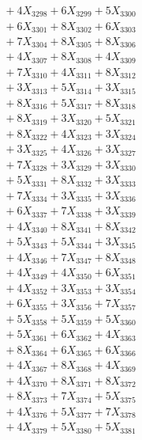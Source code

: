 \documentclass[a4paper,10pt]{article}
\begin{document}
{\begin{align}
&\;  + 4 X_{3298} + 6 X_{3299} + 5 X_{3300} \\[0.3ex]
&\;  + 6 X_{3301} + 8 X_{3302} + 6 X_{3303} \\[0.3ex]
&\;  + 7 X_{3304} + 8 X_{3305} + 8 X_{3306} \\[0.3ex]
&\;  + 4 X_{3307} + 8 X_{3308} + 4 X_{3309} \\[0.5ex]\allowbreak
&\;  + 7 X_{3310} + 4 X_{3311} + 8 X_{3312} \\[0.3ex]
&\;  + 3 X_{3313} + 5 X_{3314} + 3 X_{3315} \\[0.3ex]
&\;  + 8 X_{3316} + 5 X_{3317} + 8 X_{3318} \\[0.3ex]
&\;  + 8 X_{3319} + 3 X_{3320} + 5 X_{3321} \\[0.3ex]
&\;  + 8 X_{3322} + 4 X_{3323} + 3 X_{3324} \\[0.3ex]
&\;  + 3 X_{3325} + 4 X_{3326} + 3 X_{3327} \\[0.3ex]
&\;  + 7 X_{3328} + 3 X_{3329} + 3 X_{3330} \\[0.3ex]
&\;  + 5 X_{3331} + 8 X_{3332} + 3 X_{3333} \\[0.3ex]
&\;  + 7 X_{3334} + 3 X_{3335} + 3 X_{3336} \\[0.3ex]
&\;  + 6 X_{3337} + 7 X_{3338} + 3 X_{3339} \\[0.5ex]\allowbreak
&\;  + 4 X_{3340} + 8 X_{3341} + 8 X_{3342} \\[0.3ex]
&\;  + 5 X_{3343} + 5 X_{3344} + 3 X_{3345} \\[0.3ex]
&\;  + 4 X_{3346} + 7 X_{3347} + 8 X_{3348} \\[0.3ex]
&\;  + 4 X_{3349} + 4 X_{3350} + 6 X_{3351} \\[0.3ex]
&\;  + 4 X_{3352} + 3 X_{3353} + 3 X_{3354} \\[0.3ex]
&\;  + 6 X_{3355} + 3 X_{3356} + 7 X_{3357} \\[0.3ex]
&\;  + 5 X_{3358} + 5 X_{3359} + 5 X_{3360} \\[0.3ex]
&\;  + 5 X_{3361} + 6 X_{3362} + 4 X_{3363} \\[0.3ex]
&\;  + 8 X_{3364} + 6 X_{3365} + 6 X_{3366} \\[0.3ex]
&\;  + 4 X_{3367} + 8 X_{3368} + 4 X_{3369} \\[0.5ex]\allowbreak
&\;  + 4 X_{3370} + 8 X_{3371} + 8 X_{3372} \\[0.3ex]
&\;  + 8 X_{3373} + 7 X_{3374} + 5 X_{3375} \\[0.3ex]
&\;  + 4 X_{3376} + 5 X_{3377} + 7 X_{3378} \\[0.3ex]
&\;  + 4 X_{3379} + 5 X_{3380} + 5 X_{3381} \\[0.3ex]

\end{align}}
\end{document}
